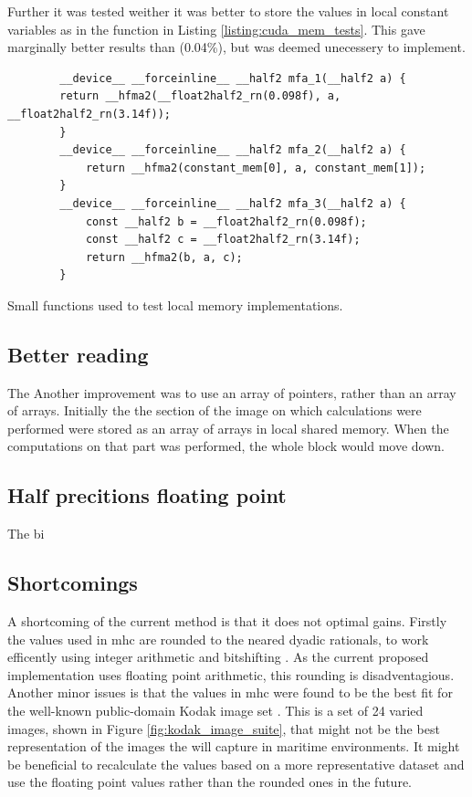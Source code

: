 Further it was tested weither it was better to store the values in local constant variables as in the  function in Listing \ref{listing:cuda_mem_tests}.
This gave marginally better results than  (0.04\%), but was deemed unecessery to implement.

\begin{listing}[H]
    \begin{verbatim}
        __device__ __forceinline__ __half2 mfa_1(__half2 a) {
        return __hfma2(__float2half2_rn(0.098f), a, __float2half2_rn(3.14f));
        }
        __device__ __forceinline__ __half2 mfa_2(__half2 a) {
            return __hfma2(constant_mem[0], a, constant_mem[1]);
        }
        __device__ __forceinline__ __half2 mfa_3(__half2 a) {
            const __half2 b = __float2half2_rn(0.098f);
            const __half2 c = __float2half2_rn(3.14f);
            return __hfma2(b, a, c);
        }
    \end{verbatim}
    \caption{Small functions used to test local memory implementations.}
    \label{listing:cuda_mem_tests}
\end{listing}



\subsection{Better reading}

The \jx
Another improvement was to use an array of pointers, rather than an array of arrays.
Initially the the section of the image on which calculations were performed were stored as an array of arrays in local shared memory.
When the computations on that part was performed, the whole block would move down.


\subsection{Half precitions floating point}
The bi



\subsection{Shortcomings}
A shortcoming of the current method is that it does not optimal gains.
Firstly the values used in \gls{mhc} are rounded to the neared dyadic rationals, to work efficently using integer arithmetic and bitshifting \cite{getreuerMalvarHeCutlerLinearImage2011}.
As the current proposed implementation uses floating point arithmetic, this rounding is disadventagious.
Another minor issues is that the values in \gls{mhc} were found to be the best fit for the well-known public-domain Kodak image set \cite{malvarHighqualityGradientcorrectedLinear2009}.
This is a set of 24 varied images, shown in Figure \ref{fig:kodak_image_suite}, that might not be the best representation of the images the \sr will capture in maritime environments.
It might be beneficial to recalculate the values based on a more representative dataset and use the floating point values rather than the rounded ones in the future.


